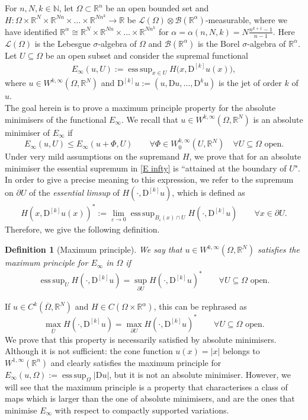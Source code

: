 \documentclass[a4paper,11pt]{article}
\numberwithin{equation}{section}
\newtheorem{Definition}[Theorem]{Definition}
\newcommand{\numberset}{\mathbb}
\newcommand{\eps}{\varepsilon}
\newcommand{\N}{\numberset{N}}
\newcommand{\Om}{\Omega}
\newcommand{\R}{\numberset{R}}
\DeclareMathOperator*{\esssup}{ess\,sup}
\theoremstyle{definition}
\begin{document}
For $n,N,k\in\N$,
 let $\Om\subset\R^n$ be an open bounded set and $H:\Om\times\R^N\times\R^{Nn}
\times\ldots\times\R^{Nn^k}\to\R$ be $\mathscr{L}(\Om)\otimes\mathscr{B}(\R^\alpha)$-measurable, where we have identified $\R^\alpha\cong\R^N\times\R^{Nn}\times\ldots\times\R^{Nn^k}$ for $\alpha=\alpha(n,N,k)=N\frac{n^{k+1}-1}{n-1}$. Here $\mathscr{L}(\Om)$ is the Lebesgue $\sigma$-algebra of $\Om$ and $\mathscr{B}(\R^\alpha)$ is the Borel $\sigma$-algebra of $\R^\alpha$. Let $U\subseteq\Om$ be an open subset and consider the supremal functional
\begin{align}\label{E infty}
E_{\infty}(u, U):=\esssup_{x\in U}H\big(x, \mathrm D ^{[k]}u(x)\big),
\end{align}
where $u\in W^{k,\infty}(\Om,\R^N)$
and $\mathrm D^{[k]} u:=(u,\mathrm Du,\ldots, \mathrm D^ku)$ is the jet of order $k$ of $u$. \\
The goal herein is to prove a maximum principle property for the absolute minimisers of the functional $E_\infty$. We recall that $u\in W^{k,\infty}(\Om,\R^N)$ is an absolute minimiser of $E_\infty$ if 
$$
E_\infty(u,U)\leq E_\infty (u+\Phi,U)\qquad\forall \Phi\in W^{k,\infty}_0(U,\R^N)\quad\forall U\subseteq\Om \mbox{ open}.
$$
Under very mild assumptions on the supremand $H$, we prove that for an absolute minimiser the essential supremum in \eqref{E infty} is ``attained at the boundary of $U$". In order to give a precise meaning to this expression, we refer to the supremum on $\partial U$ of the \textit{essential limsup} of $H(\cdot, \mathrm D ^{[k]}u)$, which is defined as
\begin{align}\label{rep}
H(x,\mathrm D ^{[k]}u(x))^*:=\lim_{\eps\to 0}\esssup_{B_\eps(x)\cap U}H(\cdot,\mathrm D ^{[k]}u)\qquad\forall x\in \partial U.
\end{align}
Therefore, we give the following definition.
\begin{Definition}[Maximum principle]
We say that $u\in W^{k,\infty}(\Om,\R^N)$ satisfies the maximum principle for $E_\infty$ in $\Om$ if
\begin{align}\label{MP}
\esssup_U H(\cdot, \mathrm D ^{[k]}u)=\sup_{\partial U}H(\cdot,\mathrm D ^{[k]}u)^*\qquad\forall U\subseteq\Om \mbox{ open}.
\end{align}
\end{Definition}
\noindent
If $u\in C^k(\overline\Om,\R^N)$ and $H\in C(\Om\times\R^\alpha)$, this can be rephrased as
$$
\max_{\overline U} H(\cdot, \mathrm D ^{[k]}u)=\max_{\partial U}H(\cdot,\mathrm D ^{[k]}u)^*\qquad\forall U\subseteq\Om \mbox{ open}.
$$
We prove that this property is necessarily satisfied by absolute minimisers. Although it is not sufficient: the cone function $u(x)=|x|$ belongs to $W^{1,\infty}(\R^n)$ and clearly satisfies the maximum principle for $E_\infty(u,\Om):=\esssup_\Om|\mathrm Du|$, but it is not an absolute minimiser. However, we will see that the maximum principle is a property that characterises a class of maps which is larger than the one of absolute minimisers, and are the ones that minimise $E_\infty$ with respect to compactly supported variations.
\end{document}
